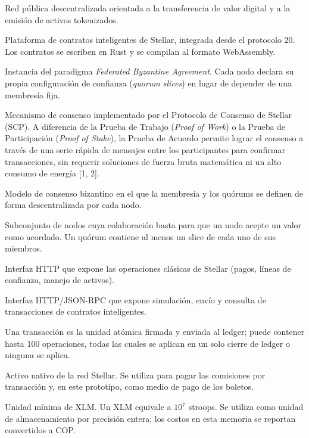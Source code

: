 \begin{description}\setlength{\itemsep}{2pt}
\item[Stellar] Red pública descentralizada orientada a la transferencia de valor digital y a la emisión de activos tokenizados.
\item[Soroban] Plataforma de contratos inteligentes de Stellar, integrada desde el protocolo 20. Los contratos se escriben en Rust y se compilan al formato WebAssembly.
\item[SCP (Stellar Consensus Protocol)] Instancia del paradigma \textit{Federated Byzantine Agreement}. Cada nodo declara su propia configuración de confianza (\textit{quorum slices}) en lugar de depender de una membresía fija.
\item[PoA (Proof of Agreement) ] Mecanismo de consenso implementado por el Protocolo de Consenso de Stellar (SCP). A diferencia de la Prueba de Trabajo (\textit{Proof of Work}) o la Prueba de Participación (\textit{Proof of Stake}), la Prueba de Acuerdo permite lograr el consenso a través de una serie rápida de mensajes entre los participantes para confirmar transacciones, sin requerir soluciones de fuerza bruta matemática ni un alto consumo de energía [1, 2].
\item[FBA (\textit{Federated Byzantine Agreement})] Modelo de consenso bizantino en el que la membresía y los quórums se definen de forma descentralizada por cada nodo.
\item[Quórum / \textit{Quorum slice}] Subconjunto de nodos cuya colaboración basta para que un nodo acepte un valor como acordado. Un quórum contiene al menos un slice de cada uno de sus miembros.
\item[Horizon] Interfaz HTTP que expone las operaciones clásicas de Stellar (pagos, líneas de confianza, manejo de activos).
\item[Soroban RPC] Interfaz HTTP/JSON-RPC que expone simulación, envío y consulta de transacciones de contratos inteligentes.
\item[Transacción y operación] Una transacción es la unidad atómica firmada y enviada al ledger; puede contener hasta 100 operaciones, todas las cuales se aplican en un solo cierre de ledger o ninguna se aplica.
\item[XLM (Lumen)] Activo nativo de la red Stellar. Se utiliza para pagar las comisiones por transacción y, en este prototipo, como medio de pago de los boletos.
\item[Stroop] Unidad mínima de XLM. Un XLM equivale a $10^{7}$ stroops. Se utiliza como unidad de almacenamiento por precisión entera; los costos en esta memoria se reportan convertidos a COP.

\end{description}
